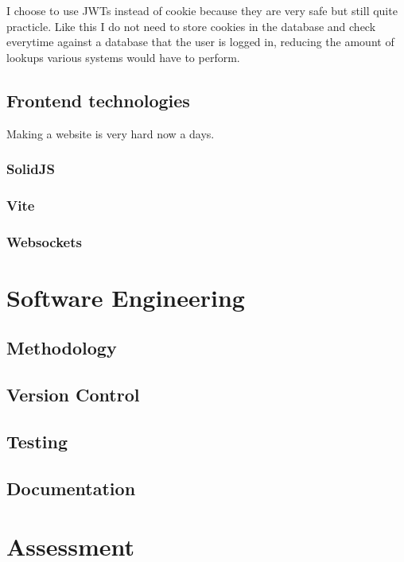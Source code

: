 \documentclass[titlepage]{article}
\begin{document}
I choose to use JWTs instead of cookie because they are very safe but still quite practicle. Like this I do not need to store cookies in the database and check everytime against a database that the user is logged in, reducing the amount of lookups various systems would have to perform.

\subsection{Frontend technologies}
Making a website is very hard now a days.

\subsubsection{SolidJS}

\subsubsection{Vite}

\subsubsection{Websockets}

\section{Software Engineering}

\subsection{Methodology}

\subsection{Version Control}

\subsection{Testing}

\subsection{Documentation}

\section{Assessment}



\end{document}
